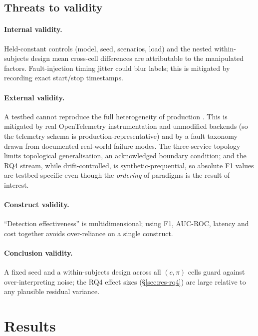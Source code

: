 \documentclass[acmsmall]{acmart}
\begin{document}
\subsection{Threats to validity}\label{sec:method-threats}

\paragraph{Internal validity.} Held-constant controls (model, seed, scenarios, load) and the nested within-subjects design mean cross-cell differences are attributable to the manipulated factors. Fault-injection timing jitter could blur labels; this is mitigated by recording exact start/stop timestamps.

\paragraph{External validity.} A testbed cannot reproduce the full heterogeneity of production \cite{hrusto2026}. This is mitigated by real OpenTelemetry instrumentation and unmodified backends (so the telemetry schema is production-representative) and by a fault taxonomy drawn from documented real-world failure modes. The three-service topology limits topological generalisation, an acknowledged boundary condition; and the RQ4 stream, while drift-controlled, is synthetic-prequential, so absolute F1 values are testbed-specific even though the \emph{ordering} of paradigms is the result of interest.

\paragraph{Construct validity.} ``Detection effectiveness'' is multidimensional; using F1, AUC-ROC, latency and cost together avoids over-reliance on a single construct.

\paragraph{Conclusion validity.} A fixed seed and a within-subjects design across all $(c,\pi)$ cells guard against over-interpreting noise; the RQ4 effect sizes (\S\ref{sec:res-rq4}) are large relative to any plausible residual variance.

\section{Results}\label{sec:results}
\end{document}
